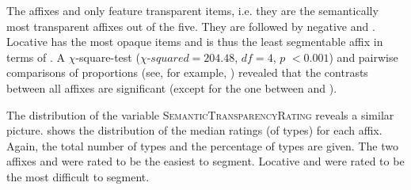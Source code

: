 \begin{table}
	\caption{Semantic Transparency by affix }
	\label{tbl:Corpus distribution semantic transparency}
	

	
\end{table}



The affixes  and  only feature transparent items, i.e. they are the semantically most transparent affixes out of the five. They are followed by negative  and . Locative  has the most opaque items and is thus the least segmentable affix in terms of .
 A $\chi$-square-test ($\chi$-$squared=204.48$, $df=4$, $p$ $< 0.001$) and  pairwise comparisons of proportions (see, for example, \citealt[chapter 6.5]{Crawley.2012}) revealed that the contrasts between all affixes are significant (except for the one between  and ).



The distribution of the variable \textsc{SemanticTransparencyRating} reveals a similar picture.  shows the distribution of the median ratings (of types) for each affix. Again, the total number of types and the percentage of types are given. 
The two affixes  and  were rated to be the easiest to segment. Locative  and  were rated to be the most difficult to segment.
 


